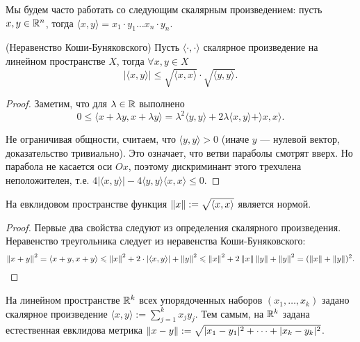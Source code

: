 \documentclass[a4paper]{article}
\theoremstyle{named}
\begin{document}
    Мы будем часто работать со следующим скалярным произведением: пусть $x, y \in \mathbb{R}^n$, тогда $\langle x, y \rangle = x_1 \cdot y_1 \dots x_n \cdot y_n$.

    \begin{lemma*} (Неравенство Коши-Буняковского) 
        Пусть $\langle \cdot, \cdot \rangle$ скалярное произведение на линейном пространстве $X$, тогда $\forall x, y \in X$
        \begin{equation*}
            |\langle x, y \rangle| \leq \sqrt{\langle x, x \rangle} \cdot \sqrt{\langle y, y \rangle}.
        \end{equation*}
    \end{lemma*}

    \begin{proof}
        Заметим, что для $\lambda \in \mathbb{R}$ выполнено
        \begin{equation*}
            0 \leq \langle x + \lambda y, x + \lambda y \rangle = \lambda^2 \langle y, y \rangle + 2\lambda \langle x, y \rangle + \rangle x, x \rangle.
        \end{equation*}

        Не ограничивая общности, считаем, что $\langle y, y \rangle > 0$ (иначе $y$ --- нулевой вектор, доказательство тривиально). Это означает, что ветви параболы смотрят вверх. Но парабола не касается оси $Ox$, поэтому дискриминант этого трехчлена неположителен, т.е. $4|\langle x, y \rangle| - 4\langle y, y \rangle \langle x, x \rangle \leq 0$.
    \end{proof}

    \begin{consequence*}
        На евклидовом пространстве функция $\left\lVert x\right\rVert := \sqrt{\langle x, x \rangle}$ является нормой.
    \end{consequence*}

    \begin{proof}
        Первые два свойства следуют из определения скалярного произведения. Неравенство треугольника следует из неравенства Коши-Буняковского:
        \begin{equation*}
            \left\lVert x + y\right\rVert^2 = \langle x + y, x + y \rangle \leqslant \left\lVert x\right\rVert^2 + 2 \cdot |\langle x, y \rangle| + \left\lVert y\right\rVert^2 \leqslant \left\lVert x\right\rVert^2 + 2\left\lVert x\right\rVert\left\lVert y\right\rVert + \left\lVert y\right\rVert^2 = (\left\lVert x\right\rVert + \left\lVert y\right\rVert)^2.
        \end{equation*}
    \end{proof}

    \begin{example*}
        На линейном пространстве $\mathbb{R}^k$ всех упорядоченных наборов $(x_1, \dots, x_k)$ задано скалярное произведение $\langle x, y \rangle := \sum_{j = 1}^k x_jy_j$. Тем самым, на $\mathbb{R}^k$ задана естественная евклидова метрика $\left\lVert x - y\right\rVert := \sqrt{|x_1 - y_1|^2 + \dots + |x_k - y_k|^2}$.
    \end{example*}
\end{document}
